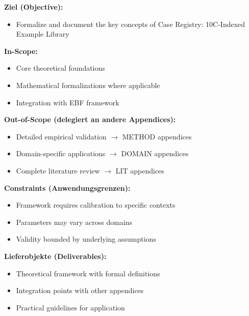 \begin{tcolorbox}[
    colback=orange!5!white,
    colframe=orange!75!black,
    title={\textbf{Appendix Scope: Ziel / In-Scope / Out-of-Scope / Constraints}},
    fonttitle=\bfseries
]

\textbf{Ziel (Objective):}
\begin{itemize}[nosep]
    \item Formalize and document the key concepts of Case Registry: 10C-Indexed Example Library
\end{itemize}

\textbf{In-Scope:}
\begin{itemize}[nosep]
    \item Core theoretical foundations
    \item Mathematical formalizations where applicable
    \item Integration with EBF framework
\end{itemize}

\textbf{Out-of-Scope (delegiert an andere Appendices):}
\begin{itemize}[nosep]
    \item Detailed empirical validation $\rightarrow$ METHOD appendices
    \item Domain-specific applications $\rightarrow$ DOMAIN appendices
    \item Complete literature review $\rightarrow$ LIT appendices
\end{itemize}

\textbf{Constraints (Anwendungsgrenzen):}
\begin{itemize}[nosep]
    \item Framework requires calibration to specific contexts
    \item Parameters may vary across domains
    \item Validity bounded by underlying assumptions
\end{itemize}

\textbf{Lieferobjekte (Deliverables):}
\begin{itemize}[nosep]
    \item Theoretical framework with formal definitions
    \item Integration points with other appendices
    \item Practical guidelines for application
\end{itemize}

\end{tcolorbox}



